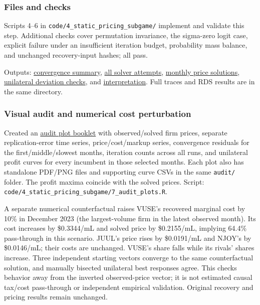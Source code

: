 \documentclass[10pt,]{article}
\begin{document}
\subsubsection{Files and checks}\label{files-and-checks-1}

Scripts 4--6 in \texttt{code/4\_static\_pricing\_subgame/} implement and
validate this step. Additional checks cover permutation invariance, the
sigma-zero logit case, explicit failure under an insufficient iteration
budget, probability mass balance, and unchanged recovery-input hashes;
all pass.

Outputs:
\href{../../output/static_pricing_subgame/manual_fixed_point_2026-10-28/convergence_summary.csv}{convergence
summary},
\href{../../output/static_pricing_subgame/manual_fixed_point_2026-10-28/solver_runs.csv}{all
solver attempts},
\href{../../output/static_pricing_subgame/manual_fixed_point_2026-10-28/monthly_price_solutions.csv}{monthly
price solutions},
\href{../../output/static_pricing_subgame/manual_fixed_point_2026-10-28/unilateral_deviation_checks.csv}{unilateral
deviation checks}, and
\href{../../output/static_pricing_subgame/manual_fixed_point_2026-10-28/interpretation.txt}{interpretation}.
Full traces and RDS results are in the same directory.

\subsubsection{Visual audit and numerical cost
perturbation}\label{visual-audit-and-numerical-cost-perturbation}

Created an
\href{../../output/static_pricing_subgame/manual_fixed_point_2026-10-28/audit/pricing_audit_plots.pdf}{audit
plot booklet} with observed/solved firm prices, separate
replication-error time series, price/cost/markup series, convergence
residuals for the first/middle/slowest months, iteration counts across
all runs, and unilateral profit curves for every incumbent in those
selected months. Each plot also has standalone PDF/PNG files and
supporting curve CSVs in the same \texttt{audit/} folder. The profit
maxima coincide with the solved prices. Script:
\texttt{code/4\_static\_pricing\_subgame/7\_audit\_plots.R}.

A separate numerical counterfactual raises VUSE's recovered marginal
cost by 10\% in December 2023 (the largest-volume firm in the latest
observed month). Its cost increases by \$0.3344/mL and solved price by
\$0.2155/mL, implying 64.4\% pass-through in this scenario. JUUL's price
rises by \$0.0191/mL and NJOY's by \$0.0146/mL; their costs are
unchanged. VUSE's share falls while its rivals' shares increase. Three
independent starting vectors converge to the same counterfactual
solution, and manually bisected unilateral best responses agree. This
checks behavior away from the inverted observed-price vector; it is not
estimated causal tax/cost pass-through or independent empirical
validation. Original recovery and pricing results remain unchanged.
\end{document}

